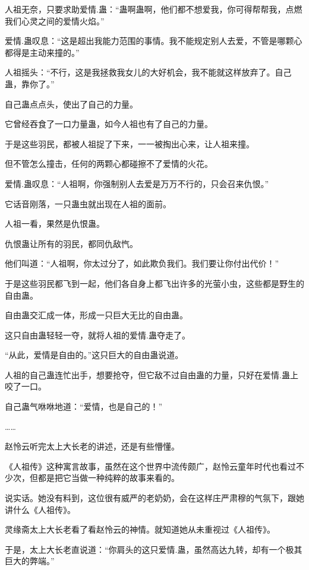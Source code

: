 
\begin{this_body}

人祖无奈，只要求助爱情.蛊：“蛊啊蛊啊，他们都不想爱我，你可得帮帮我，点燃我们心灵之间的爱情火焰。”

爱情.蛊叹息：“这是超出我能力范围的事情。我不能规定别人去爱，不管是哪颗心都得是主动来撞的。”

人祖摇头：“不行，这是我拯救我女儿的大好机会，我不能就这样放弃了。自己蛊，靠你了。”

自己蛊点点头，使出了自己的力量。

它曾经吞食了一口力量蛊，如今人祖也有了自己的力量。

于是这些羽民，都被人祖捉了下来，一一被掏出心来，让人祖来撞。

但不管怎么撞击，任何的两颗心都碰擦不了爱情的火花。

爱情.蛊叹息：“人祖啊，你强制别人去爱是万万不行的，只会召来仇恨。”

它话音刚落，一只蛊虫就出现在人祖的面前。

人祖一看，果然是仇恨蛊。

仇恨蛊让所有的羽民，都同仇敌忾。

他们叫道：“人祖啊，你太过分了，如此欺负我们。我们要让你付出代价！”

于是这些羽民都飞到一起，他们各自身上都飞出许多的光萤小虫，这些都是野生的自由蛊。

自由蛊交汇成一体，形成一只巨大无比的自由蛊。

这只自由蛊轻轻一夺，就将人祖的爱情.蛊夺走了。

“从此，爱情是自由的。”这只巨大的自由蛊说道。

人祖的自己蛊连忙出手，想要抢夺，但它敌不过自由蛊的力量，只好在爱情.蛊上咬了一口。

自己蛊气咻咻地道：“爱情，也是自己的！”

……

赵怜云听完太上大长老的讲述，还是有些懵懂。

《人祖传》这种寓言故事，虽然在这个世界中流传颇广，赵怜云童年时代也看过不少次，但都是把它当做一种纯粹的故事来看的。

说实话。她没有料到，这位很有威严的老奶奶，会在这样庄严肃穆的气氛下，跟她讲什么《人祖传》。

灵缘斋太上大长老看了看赵怜云的神情。就知道她从未重视过《人祖传》。

于是，太上大长老直说道：“你肩头的这只爱情.蛊，虽然高达九转，却有一个极其巨大的弊端。”


\end{this_body}
